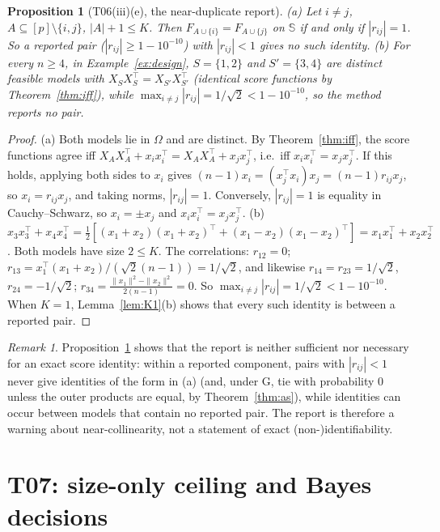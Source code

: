 \documentclass[11pt]{article}
\newtheorem{proposition}[theorem]{Proposition}
\theoremstyle{remark}
\newtheorem{remark}[theorem]{Remark}
\newcommand{\Sph}{\mathbb S}
\begin{document}
\begin{proposition}[T06(iii)(e), the near-duplicate report]\label{prop:report}
(a) Let $i\ne j$, $A\subseteq[p]\setminus\{i,j\}$, $|A|+1\le K$. Then $F_{A\cup\{i\}}=F_{A\cup\{j\}}$ on $\Sph$ if and only if $|r_{ij}|=1$. So a reported pair ($|r_{ij}|\ge1-10^{-10}$) with $|r_{ij}|<1$ gives no such identity.
(b) For every $n\ge4$, in Example~\ref{ex:design}, $S=\{1,2\}$ and $S'=\{3,4\}$ are distinct feasible models with $X_SX_S^\top=X_{S'}X_{S'}^\top$ (identical score functions by Theorem~\ref{thm:iff}), while $\max_{i\ne j}|r_{ij}|=1/\sqrt2<1-10^{-10}$, so the method reports no pair.
\end{proposition}
\begin{proof}
(a) Both models lie in $\Omega$ and are distinct. By Theorem~\ref{thm:iff}, the score functions agree iff $X_AX_A^\top+x_ix_i^\top=X_AX_A^\top+x_jx_j^\top$, i.e.\ iff $x_ix_i^\top=x_jx_j^\top$. If this holds, applying both sides to $x_i$ gives $(n-1)x_i=(x_j^\top x_i)x_j=(n-1)r_{ij}x_j$, so $x_i=r_{ij}x_j$, and taking norms, $|r_{ij}|=1$. Conversely, $|r_{ij}|=1$ is equality in Cauchy--Schwarz, so $x_i=\pm x_j$ and $x_ix_i^\top=x_jx_j^\top$.
(b) $x_3x_3^\top+x_4x_4^\top=\tfrac12[(x_1+x_2)(x_1+x_2)^\top+(x_1-x_2)(x_1-x_2)^\top]=x_1x_1^\top+x_2x_2^\top$. Both models have size $2\le K$. The correlations: $r_{12}=0$; $r_{13}=x_1^\top(x_1+x_2)/(\sqrt2(n-1))=1/\sqrt2$, and likewise $r_{14}=r_{23}=1/\sqrt2$, $r_{24}=-1/\sqrt2$; $r_{34}=\frac{\|x_1\|^2-\|x_2\|^2}{2(n-1)}=0$. So $\max_{i\ne j}|r_{ij}|=1/\sqrt2<1-10^{-10}$. When $K=1$, Lemma~\ref{lem:K1}(b) shows that every such identity is between a reported pair.
\end{proof}

\begin{remark}
Proposition~\ref{prop:report} shows that the report is neither sufficient nor necessary for an exact score identity: within a reported component, pairs with $|r_{ij}|<1$ never give identities of the form in (a) (and, under G, tie with probability $0$ unless the outer products are equal, by Theorem~\ref{thm:as}), while identities can occur between models that contain no reported pair. The report is therefore a warning about near-collinearity, not a statement of exact (non-)identifiability.
\end{remark}

\section{T07: size-only ceiling and Bayes decisions}\label{sec:T07}
\end{document}
